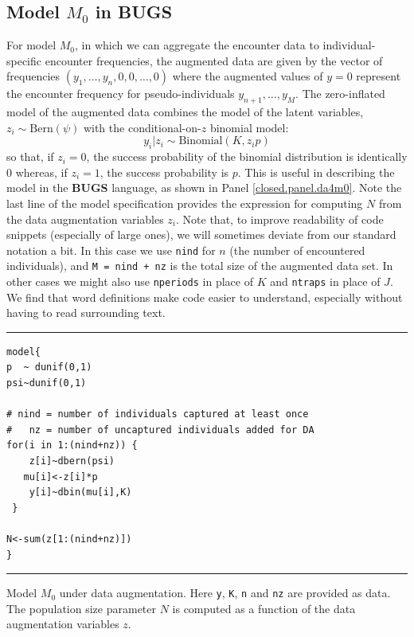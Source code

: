\subsection{Model $M_0$ in BUGS}

For model $M_0$, in which we can aggregate the encounter data to
individual-specific encounter frequencies, the augmented data are
given by the vector of frequencies $(y_{1}, \ldots, y_{n}, 0, 0,
\ldots, 0)$ where the augmented values of $y=0$ represent the encounter
frequency  for pseudo-individuals $y_{n+1},\ldots,y_{M}$.
The zero-inflated model of the augmented data combines
the model of the latent variables, $z_{i} \sim \mbox{Bern}(\psi)$ with
the conditional-on-$z$ binomial model:
\[
y_{i}|z_{i}   \sim \mbox{Binomial}(K,z_{i} p)
\]
so that, if $z_{i}=0$, the success probability of the binomial
distribution is identically 0 whereas, if $z_{i}=1$, the success
probability is $p$. This is useful in describing the model in the {\bf
  BUGS} language, as shown in Panel \ref{closed.panel.da4m0}.
 Note the last line of the model
specification  provides the expression for computing $N$ from the
data augmentation variables $z_{i}$. Note that, to improve readability of code
snippets (especially of large ones), we will sometimes deviate from our
standard notation a bit. In this case we use \mbox{\tt nind} for $n$
(the number of encountered individuals), and \mbox{\tt M = nind + nz}
is the total size of the augmented data set. In other cases we might
also use \mbox{\tt nperiods} in place of $K$ and \mbox{\tt ntraps} in
place of $J$. We find that word definitions make code easier to
understand, especially without having to read surrounding text.

\begin{panel}[ht]
\centering
\rule[0.15in]{\textwidth}{.03in}
{\small
\begin{verbatim}
model{
p  ~ dunif(0,1)
psi~dunif(0,1)

# nind = number of individuals captured at least once
#   nz = number of uncaptured individuals added for DA
for(i in 1:(nind+nz)) {
    z[i]~dbern(psi)
   mu[i]<-z[i]*p
    y[i]~dbin(mu[i],K)
 }

N<-sum(z[1:(nind+nz)])
}
\end{verbatim}
}
\rule[-0.15in]{\textwidth}{.03in}
\caption{Model $M_{0}$ under data augmentation. Here \mbox{\tt y},
  \mbox{\tt K}, \mbox{\tt n} and \mbox{\tt nz} are provided as
  data. The population size parameter $N$ is computed as a function of
the data augmentation variables $z$. }
\label{closed.panel.da4m0}
\end{panel}

